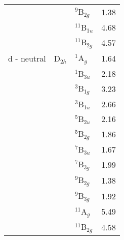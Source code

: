 \begin{center}
\begin{longtable}{llll}
                &          & $^9$B$_{2g}$    & 1.38                 \\
                &          & $^{11}$B$_{1u}$ & 4.68                 \\
                &          & $^{11}$B$_{2g}$ & 4.57                 \\ \midrule
    d - neutral & D$_{2h}$ & $^1$A$_g$       & 1.64                 \\
                &          & $^1$B$_{3u}$    & 2.18                 \\
                &          & $^3$B$_{1g}$    & 3.23                 \\
                &          & $^3$B$_{1u}$    & 2.66                 \\
                &          & $^5$B$_{2u}$    & 2.16                 \\
                &          & $^5$B$_{2g}$    & 1.86                 \\
                &          & $^7$B$_{3u}$    & 1.67                 \\
                &          & $^7$B$_{3g}$    & 1.99                 \\
                &          & $^9$B$_{2g}$    & 1.38                 \\
                &          & $^9$B$_{3g}$    & 1.92                 \\
                &          & $^{11}$A$_g$    & 5.49                 \\
                &          & $^{11}$B$_{2g}$ & 4.58                 
            \label{a6tbl:RE}
    \end{longtable}                                                                          
    \end{center}
    
    
    
